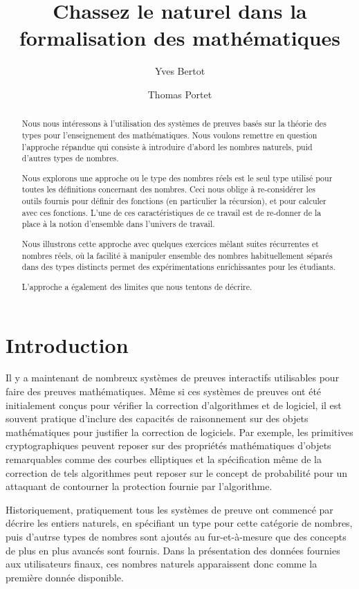 \documentclass[draft]{jflart}
\title{Chassez le naturel dans la formalisation des mathématiques}
\author[1]{Yves Bertot}
\author[1]{Thomas Portet}
\affil[1]{Centre Inria de l'Université Côte d'Azur, France}
\begin{document}
\maketitle

\begin{abstract}
  Nous nous intéressons à l'utilisation des systèmes de preuves basés sur la
  théorie des types pour l'enseignement des mathématiques.  Nous voulons
  remettre en question l'approche répandue qui consiste à introduire
  d'abord les nombres naturels, puid d'autres types de nombres.

  Nous explorons une approche ou le type des nombres réels est le seul type
  utilisé pour toutes les définitions concernant des nombres.  Ceci nous oblige
  à re-considérer les outils fournis pour définir des fonctions (en particulier
  la récursion), et pour calculer avec ces fonctions.
  L'une de ces caractéristiques de ce travail est de re-donner de la place à
  la notion d'ensemble dans l'univers de travail.

  Nous illustrons cette approche avec quelques exercices mêlant suites
  récurrentes et nombres réels, où la facilité à manipuler ensemble des nombres
  habituellement séparés dans des types distincts permet des expérimentations
  enrichissantes pour les étudiants.

  L'approche a également des limites que nous tentons de décrire.
\end{abstract}

\section{Introduction}

Il y a maintenant de nombreux systèmes de preuves interactifs
utilisables pour faire des preuves mathématiques.  Même si ces
systèmes de preuves ont été initialement conçus pour vérifier la
correction d'algorithmes et de logiciel, il est souvent pratique
d'inclure des capacités de raisonnement sur des objets mathématiques
pour justifier la correction de logiciels.  Par exemple, les
primitives cryptographiques peuvent reposer sur des propriétés
mathématiques d'objets remarquables comme des courbes elliptiques et
la spécification même de la correction de tels algorithmes peut
reposer sur le concept de probabilité pour un attaquant de contourner
la protection fournie par l'algorithme.

Historiquement, pratiquement tous les systèmes de preuve ont commencé
par décrire les entiers naturels, en spécifiant un type pour cette
catégorie de nombres, puis d'autrse types de nombres sont ajoutés au
fur-et-à-mesure que des concepts de plus en plus avancés sont fournis.
Dans la présentation des données fournies aux utilisateurs finaux, ces
nombres naturels apparaissent donc comme la première donnée
disponible.
\end{document}
